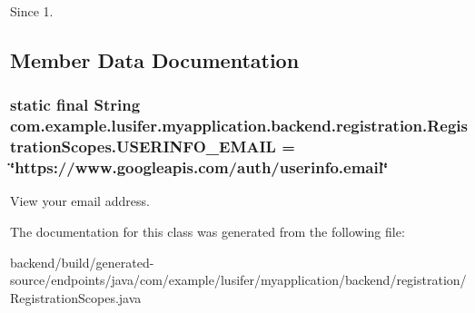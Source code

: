 \begin{DoxySince}{Since}
1. 
\end{DoxySince}


\subsection{Member Data Documentation}
\hypertarget{classcom_1_1example_1_1lusifer_1_1myapplication_1_1backend_1_1registration_1_1_registration_scopes_acbdfff3045dac9ee891d263de11fd7ab}{}
\subsubsection[{U\+S\+E\+R\+I\+N\+F\+O\+\_\+\+E\+M\+A\+I\+L}]{\setlength{\rightskip}{0pt plus 5cm}static final String com.\+example.\+lusifer.\+myapplication.\+backend.\+registration.\+Registration\+Scopes.\+U\+S\+E\+R\+I\+N\+F\+O\+\_\+\+E\+M\+A\+I\+L = \char`\"{}https\+://www.\+googleapis.\+com/auth/userinfo.\+email\char`\"{}\hspace{0.3cm}{\ttfamily [static]}}\label{classcom_1_1example_1_1lusifer_1_1myapplication_1_1backend_1_1registration_1_1_registration_scopes_acbdfff3045dac9ee891d263de11fd7ab}
View your email address. 

The documentation for this class was generated from the following file\+:\begin{DoxyCompactItemize}
\item 
backend/build/generated-\/source/endpoints/java/com/example/lusifer/myapplication/backend/registration/Registration\+Scopes.\+java\end{DoxyCompactItemize}
